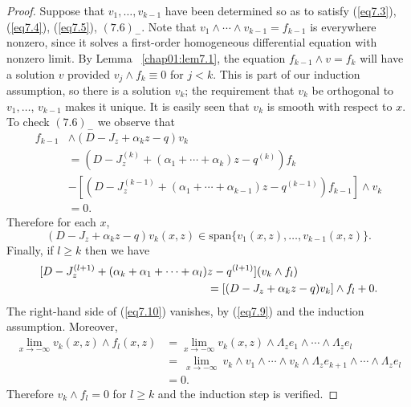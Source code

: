 \documentclass{surv-l}
\theoremstyle{plain}
\theoremstyle{definition}
\numberwithin{equation}{chapter}
\begin{document}
\begin{proof}
Suppose that $ v_{1},\ldots,v_{k-1}$ have been determined so as to satisfy (\ref{eq7.3}), (\ref{eq7.4}), (\ref{eq7.5}), $(7.6)_{-}$. Note that $ v_{1}\wedge\cdots\wedge v_{k-1}=f_{k-1}$ is everywhere nonzero, since it solves a first-order homogeneous differential equation with nonzero limit. By Lemma ~\ref{chap01:lem7.1}, the equation $f_{k-1}\wedge v=f_{k}$ will have a solution $v$ provided $v_{j}\wedge f_{k} \equiv 0$ for $j<k$. This is part of our induction assumption, so there is a solution $v_{k}$; the requirement that $v_{k}$ be orthogonal to $ v_{1},\ldots$, $v_{k-1}$ makes it unique. It is easily seen that $v_{k}$ is smooth with respect to $x$. To check $(7.6)_{-}$ we observe that
\begin{align*}
f_{k-1}&\wedge(D-J_{z}+\alpha_{k}z-q)v_{k}\\
&=(D-J_{z}^{(k)}+ (\alpha_{1}+\cdots+\alpha_{k})z-q^{(k)})f_{k}\\
&-[(D-J_{z}^{(k-1)}+ (\alpha_{1}+\cdots+\alpha_{k-1})z-q^{(k-1)})f_{k-1}]\wedge v_{k}\\
&=0.
\end{align*}
Therefore for each $x$,
\begin{equation}\label{eq7.9}
(D-J_{z}+\alpha_{k}z-q)v_{k}(x, z)\in \mathrm{span}\{v_{1}(x, z),\ldots,v_{k-1}(x, z)\}.
\end{equation}
Finally, if $l\geq k$ then we have
\begin{align}\label{eq7.10}
[D-J_{z}^{(l+1)}+(\alpha_{k}+\alpha_{1}+\cdots+\alpha_{l})&z-q^{(l+1)}](v_{k}\wedge f_{l})\\
&=[(D-J_{z}+\alpha_{k}z-q)v_{k}]\wedge f_{l}+0.\notag
\end{align}
The right-hand side of (\ref{eq7.10}) vanishes, by (\ref{eq7.9}) and the induction assumption. Moreover,
\begin{align*}
\displaystyle \lim_{x\rightarrow-\infty} v_{k}(x, z)\wedge f_{l}(x, z)&= \displaystyle \lim_{x\rightarrow-\infty}  v_{k}(x,z)\wedge\Lambda_{z}e_{1}\wedge\cdots\wedge\Lambda_{z}e_{l}\\
&=\ \lim_{x\rightarrow-\infty}\  v_{k}\wedge v_{1}\wedge\cdots\wedge v_{k}\wedge\Lambda_{z}e_{k+1}\wedge\cdots\wedge\Lambda_{z}e_{l}\\
&=0.
\end{align*}
Therefore $v_{k}\wedge f_{l}=0$ for $l\geq k$ and the induction step is verified.
\end{proof}
\end{document}
